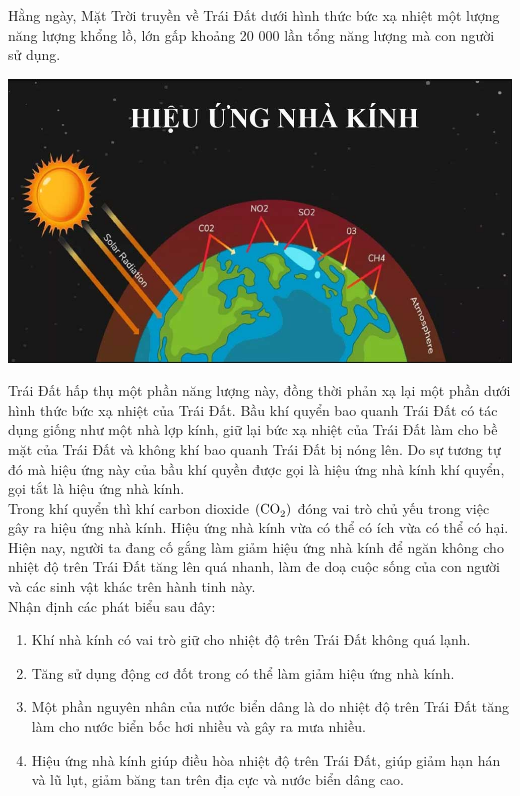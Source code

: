 \begin{ex}
	Hằng ngày, Mặt Trời truyền về Trái Đất dưới hình thức bức xạ nhiệt một lượng năng lượng khổng lồ, lớn gấp khoảng 20 000 lần tổng năng lượng mà con người sử dụng. 
	\begin{center}
		\includegraphics[width=0.45\linewidth]{figs/VN12-Y24-PH-SYL-003P-6}
	\end{center}
	Trái Đất hấp thụ một phần năng lượng này, đồng thời phản xạ lại một phần dưới hình thức bức xạ nhiệt của Trái Đất. Bầu khí quyển bao quanh Trái Đất có tác dụng giống như một nhà lợp kính, giữ lại bức xạ nhiệt của Trái Đất làm cho bề mặt của Trái Đất và không khí bao quanh Trái Đất bị nóng lên. Do sự tương tự đó mà hiệu ứng này của bầu khí quyền được gọi là hiệu ứng nhà kính khí quyển, gọi tắt là hiệu ứng nhà kính.\\
	Trong khí quyển thì khí carbon dioxide $\left(\ce{CO_2}\right)$ đóng vai trò chủ yếu trong việc gây ra hiệu ứng nhà kính. Hiệu ứng nhà kính vừa có thể có ích vừa có thể có hại. Hiện nay, người ta đang cố gắng làm giảm hiệu ứng nhà kính để ngăn không cho nhiệt độ trên Trái Đất tăng lên quá nhanh, làm đe doạ cuộc sống của con người và các sinh vật khác trên hành tinh này.\\
	Nhận định các phát biểu sau đây: 
	\begin{enumerate}[label=\alph*)]
		\item Khí nhà kính có vai trò giữ cho nhiệt độ trên Trái Đất không quá lạnh.
		\item Tăng sử dụng động cơ đốt trong có thể làm giảm hiệu ứng nhà kính.
		\item Một phần nguyên nhân của nước biển dâng là do nhiệt độ trên Trái Đất tăng làm cho nước biển bốc hơi nhiều và gây ra mưa nhiều.
		\item Hiệu ứng nhà kính giúp điều hòa nhiệt độ trên Trái Đất, giúp giảm hạn hán và lũ lụt, giảm băng tan trên địa cực và nước biển dâng cao.
	\end{enumerate}
	\end{ex}


